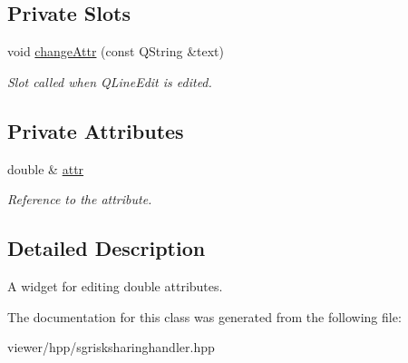 \subsection*{Private Slots}
\begin{DoxyCompactItemize}
\item 
\mbox{\label{classSGDblAttrEdit_a505bef38972a15a8537d3c4369f62f8d}} 
void \hyperlink{classSGDblAttrEdit_a505bef38972a15a8537d3c4369f62f8d}{change\+Attr} (const Q\+String \&text)
\begin{DoxyCompactList}\small\item\em Slot called when Q\+Line\+Edit is edited. \end{DoxyCompactList}\end{DoxyCompactItemize}
\subsection*{Private Attributes}
\begin{DoxyCompactItemize}
\item 
\mbox{\label{classSGDblAttrEdit_ad64b0b1fc2a05de5fc89d2d3dceeadf9}} 
double \& \hyperlink{classSGDblAttrEdit_ad64b0b1fc2a05de5fc89d2d3dceeadf9}{attr}
\begin{DoxyCompactList}\small\item\em Reference to the attribute. \end{DoxyCompactList}\end{DoxyCompactItemize}


\subsection{Detailed Description}
A widget for editing double attributes. 

The documentation for this class was generated from the following file\+:\begin{DoxyCompactItemize}
\item 
viewer/hpp/sgrisksharinghandler.\+hpp\end{DoxyCompactItemize}
